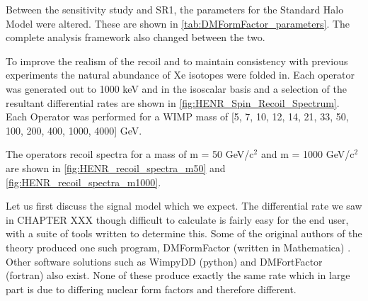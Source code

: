 \par
Between the sensitivity study and SR1, the parameters for the Standard Halo Model were altered.
These are shown in \autoref{tab:DMFormFactor_parameters}.
The complete analysis framework also changed between the two.


To improve the realism of the recoil and to maintain consistency with previous experiments the natural abundance of Xe isotopes were folded in.
Each operator was generated out to 1000 keV and in the isoscalar basis and a selection of the resultant differential rates are shown in \autoref{fig:HENR_Spin_Recoil_Spectrum}.
Each Operator was performed for a WIMP mass of [5, 7, 10, 12, 14, 21, 33, 50, 100, 200, 400, 1000, 4000] GeV.


\par
The operators recoil spectra for a mass of m = 50 GeV/c$^2$ and m = 1000 GeV/c$^2$ are shown in \autoref{fig:HENR_recoil_spectra_m50} and \autoref{fig:HENR_recoil_spectra_m1000}.



\iffalse
\par
Let us first discuss the signal model which we expect.
The differential rate we saw in CHAPTER XXX though difficult to calculate is fairly easy for the end user, with a suite of tools written to determine this.
Some of the original authors of the theory produced one such program, DMFormFactor (written in Mathematica) \cite{dmformfactor_ref}.
Other software solutions such as WimpyDD (python) and DMFortFactor (fortran) also exist.
None of these produce exactly the same rate which in large part is due to differing nuclear form factors and therefore different.

